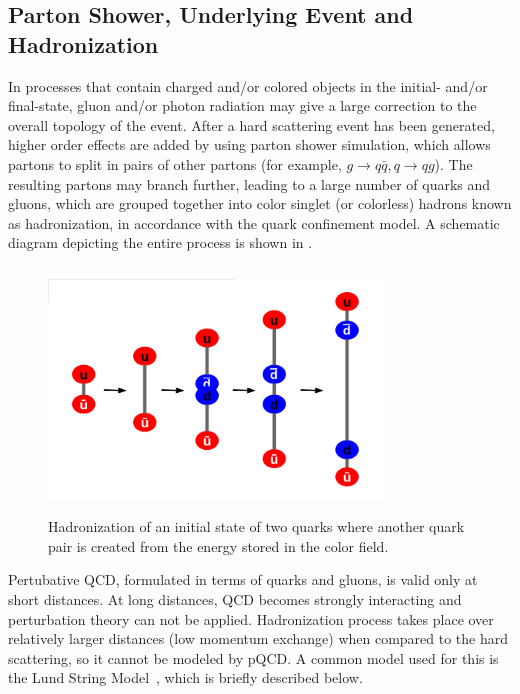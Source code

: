 \subsection{Parton Shower, Underlying Event and Hadronization}
In processes that contain charged and/or colored objects in the initial- and/or final-state, gluon and/or photon radiation may give a large correction
to the overall topology of the event. After a hard scattering event has been generated, higher order effects are added by using parton shower 
simulation, which allows partons to split in pairs of other partons (for example, $g\rightarrow{q\bar{q}},q\rightarrow{qg}$).
The resulting partons may branch further, leading to a large number of quarks and gluons, which are grouped together into color singlet (or colorless) 
hadrons known as hadronization, in accordance with the quark confinement model. A schematic diagram depicting the entire process is shown in \fig{\ref{fig:EventGeneration}}. 
\begin{figure}[h!]
\centering
\includegraphics[width=9cm,height=6.5cm]{ch3/figures/Lund_String_Model.png}
\caption{Hadronization of an initial state of two quarks where another quark pair is created from the energy stored in the color field.}
\label{fig:LundModel}
\end{figure}

Pertubative QCD, formulated in terms of quarks and gluons, is valid only at short distances. At long distances, QCD becomes strongly interacting and 
perturbation theory can not be applied. Hadronization process takes place over relatively larger distances (low momentum exchange) when compared to 
the hard scattering, so it cannot be modeled by pQCD. 
A common model used for this is the Lund String Model~\cite{Sjostrand:1986hx}, which is briefly described below. 

